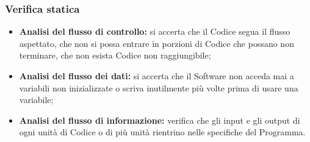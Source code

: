    \subsubsection{Verifica statica}
   \begin{itemize}
   
   \item \textbf{Analisi del flusso di controllo:} si accerta che il Codice segua il flusso aspettato, che non si possa entrare in porzioni di Codice che possano non
   terminare, che non esista Codice non raggiungibile;
   \item \textbf{Analisi del flusso dei dati:} si accerta che il Software non acceda mai a variabili non inizializzate o scriva inutilmente più volte prima di usare una variabile;
   \item \textbf{Analisi del flusso di informazione:} verifica che gli input e gli output di ogni unità di Codice o di più unità rientrino nelle specifiche del Programma.
   
  
   \end{itemize}
   
